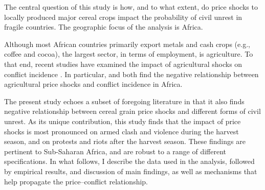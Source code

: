 \documentclass[11pt]{article}
\begin{document}
The central question of this study is how, and to what extent, do price shocks to locally produced major cereal crops impact the probability of civil unrest in fragile countries. The geographic focus of the analysis is Africa. 

Although most African countries primarily export metals and cash crops (e.g., coffee and cocoa), the largest sector, in terms of employment, is agriculture. To that end, recent studies have examined the impact of agricultural shocks on conflict incidence \citep{berman2015,fjelde2015,mcguirk2020}. In particular, \cite{berman2015} and \cite{fjelde2015} both find the negative relationship between agricultural price shocks and conflict incidence in Africa. 

The present study echoes a subset of foregoing literature in that it also finds negative relationship between cereal grain price shocks and different forms of civil unrest. As its unique contribution, this study finds that the impact of price shocks is most pronounced on armed clash and violence during the harvest season, and on protests and riots after the harvest season. These findings are pertinent to Sub-Saharan Africa, and are robust to a range of different specifications. In what follows, I describe the data used in the analysis, followed by empirical results, and discussion of main findings, as well as mechanisms that help propagate the price--conflict relationship.


\end{document}
